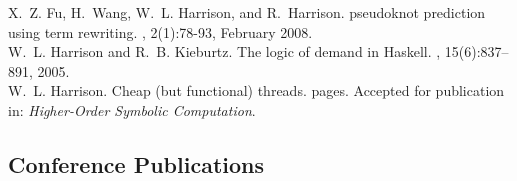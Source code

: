 \documentclass[12pt]{article} %
\begin{document}
X.~Z. Fu, H.~Wang, W.~L. Harrison, and R.~Harrison.
 pseudoknot prediction using term rewriting.
, 2(1):78-93, February 2008.
\\


W.~L. Harrison and R.~B. Kieburtz.
\newblock The logic of demand in {H}askell.
, 15(6):837--891, 2005.
\\


W.~L. Harrison.
\newblock Cheap (but functional) threads.
 pages. Accepted for publication in: {\em Higher-Order Symbolic Computation}. 

\subsection*{Conference Publications}
\end{document}
